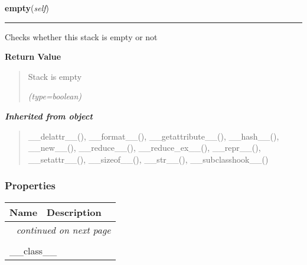     \label{UnBlockMe:Utility:Stack:Stack:empty}

    \vspace{0.5ex}

\hspace{.8\funcindent}\begin{boxedminipage}{\funcwidth}

    \raggedright \textbf{empty}(\textit{self})

    \vspace{-1.5ex}

    \rule{\textwidth}{0.5\fboxrule}
\setlength{\parskip}{2ex}
    Checks whether this stack is empty or not

\setlength{\parskip}{1ex}
      \textbf{Return Value}
    \vspace{-1ex}

      \begin{quote}
      Stack is empty

      {\it (type=boolean)}

      \end{quote}

    \end{boxedminipage}


\large{\textbf{\textit{Inherited from object}}}

\begin{quote}
\_\_delattr\_\_(), \_\_format\_\_(), \_\_getattribute\_\_(), \_\_hash\_\_(), \_\_new\_\_(), \_\_reduce\_\_(), \_\_reduce\_ex\_\_(), \_\_repr\_\_(), \_\_setattr\_\_(), \_\_sizeof\_\_(), \_\_str\_\_(), \_\_subclasshook\_\_()
\end{quote}


  \subsubsection{Properties}

    \vspace{-1cm}
\hspace{\varindent}\begin{longtable}{|p{\varnamewidth}|p{\vardescrwidth}|l}
\cline{1-2}
\cline{1-2} \centering \textbf{Name} & \centering \textbf{Description}& \\
\cline{1-2}
\endhead\cline{1-2}\multicolumn{3}{r}{\small\textit{continued on next page}}\\\endfoot\cline{1-2}
\endlastfoot\multicolumn{2}{|l|}{\textit{Inherited from object}}\\
\multicolumn{2}{|p{\varwidth}|}{\raggedright \_\_class\_\_}\\
\cline{1-2}
\end{longtable}


